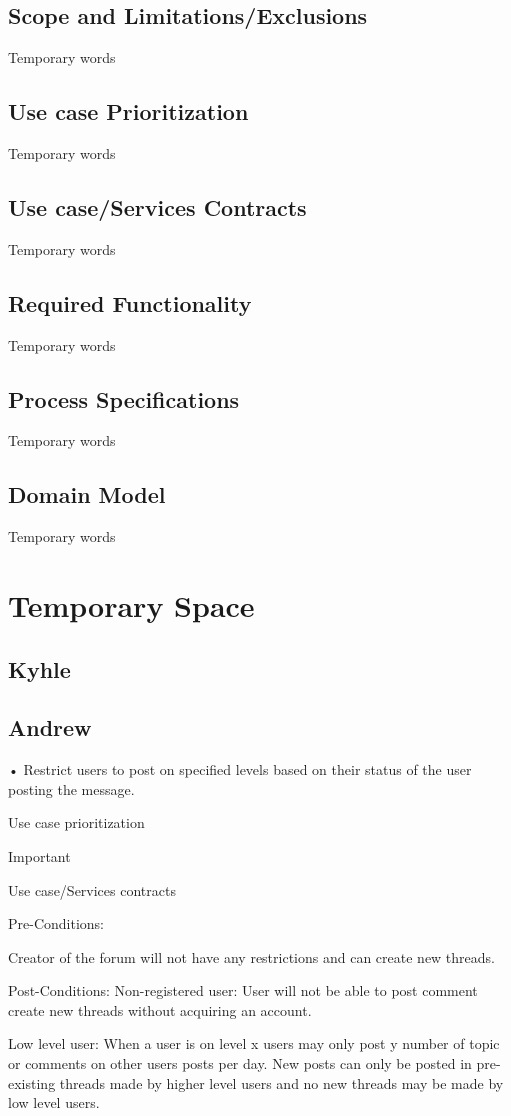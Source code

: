 \documentclass[11pt]{article}
\begin{document}
\subsection{Scope and Limitations/Exclusions}
Temporary words
\subsection{Use case Prioritization}
Temporary words
\subsection{Use case/Services Contracts}
Temporary words
\subsection{Required Functionality}
Temporary words
\subsection{Process Specifications}
Temporary words
\subsection{Domain Model}
Temporary words
\section{Temporary Space}
\subsection{Kyhle}
\subsection{Andrew}
•	Restrict users to post on specified levels based on their status of the user posting the message.

Use case prioritization

	Important

Use case/Services contracts

Pre-Conditions:

Creator of the forum will not have any restrictions and can create new threads.

Post-Conditions:
Non-registered user:
User will not be able to post comment create new threads without acquiring an account.

Low level user:
When a user is on level x users may only post y number of topic or comments on other users posts per day. New posts can only be posted in pre-existing threads made by higher level users and no new threads may be made by low level users. 
\end{document}
